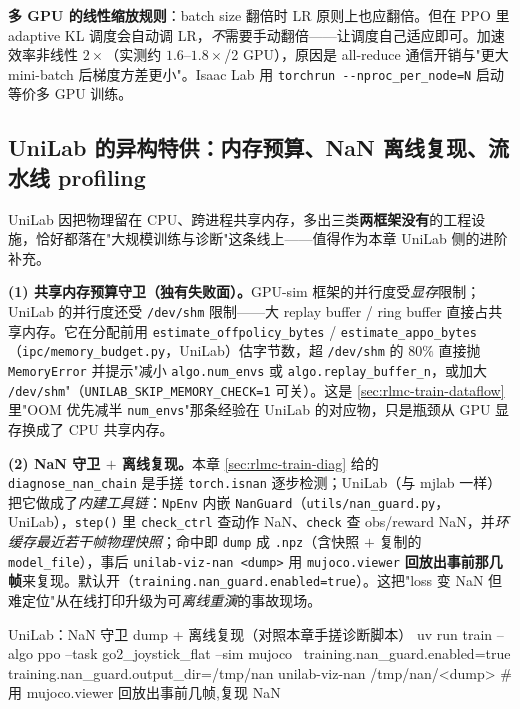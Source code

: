 \begin{note}
\textbf{多 GPU 的线性缩放规则}：batch size 翻倍时 LR 原则上也应翻倍。但在 PPO 里 adaptive KL 调度会自动调 LR，\emph{不}需要手动翻倍——让调度自己适应即可。加速效率非线性 $2\times$（实测约 $1.6$--$1.8\times$/2 GPU），原因是 all-reduce 通信开销与"更大 mini-batch 后梯度方差更小"。Isaac Lab 用 \verb|torchrun --nproc_per_node=N| 启动等价多 GPU 训练。
\end{note}

\subsection{UniLab 的异构特供：内存预算、NaN 离线复现、流水线 profiling}

UniLab 因把物理留在 CPU、跨进程共享内存，多出三类\textbf{两框架没有}的工程设施，恰好都落在"大规模训练与诊断"这条线上——值得作为本章 UniLab 侧的进阶补充。

\textbf{(1) 共享内存预算守卫（独有失败面）。}GPU-sim 框架的并行度受\emph{显存}限制；UniLab 的并行度还受 \verb|/dev/shm| 限制——大 replay buffer / ring buffer 直接占共享内存。它在分配前用 \verb|estimate_offpolicy_bytes| / \verb|estimate_appo_bytes|（\verb|ipc/memory_budget.py|，UniLab）估字节数，超 \verb|/dev/shm| 的 $80\%$ 直接抛 \verb|MemoryError| 并提示"减小 \verb|algo.num_envs| 或 \verb|algo.replay_buffer_n|，或加大 \verb|/dev/shm|"（\verb|UNILAB_SKIP_MEMORY_CHECK=1| 可关）。这是 \cref{sec:rlmc-train-dataflow} 里"OOM 优先减半 \verb|num_envs|"那条经验在 UniLab 的对应物，只是瓶颈从 GPU 显存换成了 CPU 共享内存。

\textbf{(2) NaN 守卫 $+$ 离线复现。}本章 \cref{sec:rlmc-train-diag} 给的 \verb|diagnose_nan_chain| 是手搓 \verb|torch.isnan| 逐步检测；UniLab（与 mjlab 一样）把它做成了\emph{内建工具链}：\verb|NpEnv| 内嵌 \verb|NanGuard|（\verb|utils/nan_guard.py|，UniLab），\verb|step()| 里 \verb|check_ctrl| 查动作 NaN、\verb|check| 查 obs/reward NaN，并\emph{环缓存最近若干帧物理快照}；命中即 \verb|dump| 成 \verb|.npz|（含快照 $+$ 复制的 \verb|model_file|），事后 \verb|unilab-viz-nan <dump>| 用 \verb|mujoco.viewer| \textbf{回放出事前那几帧}来复现。默认开（\verb|training.nan_guard.enabled=true|）。这把"loss 变 NaN 但难定位"从在线打印升级为可\emph{离线重演}的事故现场。

\begin{codebox}[bash]{UniLab：NaN 守卫 dump + 离线复现（对照本章手搓诊断脚本）}
uv run train --algo ppo --task go2_joystick_flat --sim mujoco \
    training.nan_guard.enabled=true training.nan_guard.output_dir=/tmp/nan
unilab-viz-nan /tmp/nan/<dump>     # 用 mujoco.viewer 回放出事前几帧,复现 NaN
\end{codebox}

